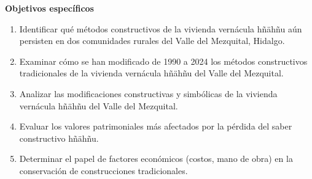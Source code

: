 \vspace{1em}
\textbf{Objetivos específicos}
\begin{enumerate}
	\item{Identificar qué métodos constructivos de la vivienda vernácula hñähñu aún persisten en dos comunidades rurales del Valle del Mezquital, Hidalgo.}

	\item{Examinar cómo se han modificado de 1990 a 2024 los métodos constructivos tradicionales de la vivienda vernácula hñähñu del Valle del Mezquital.}

	\item{Analizar las modificaciones constructivas y simbólicas de la vivienda vernácula hñähñu del Valle del Mezquital.}

	\item{Evaluar los valores patrimoniales más afectados por la pérdida del saber constructivo hñähñu.}

	\item{Determinar el papel de factores económicos (costos, mano de obra) en la conservación de construcciones tradicionales.}
\end{enumerate}
